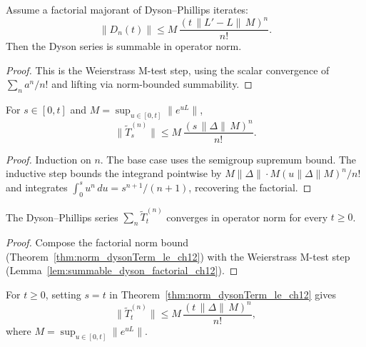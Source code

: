 \begin{lemma}
    \label{lem:summable_dyson_factorial_ch12}
    \leanok
    Assume a factorial majorant of Dyson--Phillips iterates:
    \[
        \|D_n(t)\|
        \le M\,\frac{(t\,\|L'-L\|\,M)^n}{n!}.
    \]
    Then the Dyson series is summable in operator norm.
\end{lemma}

\begin{proof}
    \leanok
    This is the Weierstrass M-test step, using the scalar convergence of
    $\sum_n a^n/n!$ and lifting via norm-bounded summability.
\end{proof}

\begin{theorem}
    \label{thm:norm_dysonTerm_le_ch12}
    \leanok
    For $s \in [0,t]$ and $M = \sup_{u \in [0,t]} \|e^{uL}\|$,
    \[
        \|\widetilde{T}^{(n)}_s\|
        \le M\,\frac{(s\,\|\Delta\|\,M)^n}{n!}.
    \]
\end{theorem}

\begin{proof}
    \leanok
    Induction on $n$. The base case uses the semigroup supremum bound.
    The inductive step bounds the integrand pointwise by
    $M\|\Delta\| \cdot M(u\|\Delta\|M)^n/n!$ and integrates
    $\int_0^s u^n\,du = s^{n+1}/(n+1)$, recovering the factorial.
\end{proof}

\begin{corollary}
    \label{cor:summable_dysonTerm_ch12}
    \leanok
    The Dyson--Phillips series $\sum_n \widetilde{T}^{(n)}_t$
    converges in operator norm for every $t \ge 0$.
\end{corollary}

\begin{proof}
    \leanok
    Compose the factorial norm bound
    (Theorem~\ref{thm:norm_dysonTerm_le_ch12}) with the
    Weierstrass M-test step
    (Lemma~\ref{lem:summable_dyson_factorial_ch12}).
\end{proof}

\begin{corollary}
    \label{cor:norm_dysonTerm_le_at_ch12}
    \leanok
    For $t \ge 0$, setting $s=t$ in Theorem~\ref{thm:norm_dysonTerm_le_ch12}
    gives
    \[
        \|\widetilde{T}^{(n)}_t\|
        \le M\,\frac{(t\,\|\Delta\|\,M)^n}{n!},
    \]
    where $M = \sup_{u \in [0,t]} \|e^{uL}\|$.
\end{corollary}

